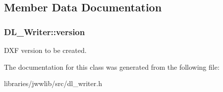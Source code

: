 \subsection{Member Data Documentation}
\hypertarget{classDL__Writer_af82f15c96f8ddaa4ebfffdb5ea41fb8c}{
\subsubsection[{version}]{ D\-L\-\_\-\-Writer\-::version\hspace{0.3cm}{\ttfamily [protected]}}}\label{classDL__Writer_af82f15c96f8ddaa4ebfffdb5ea41fb8c}
D\-X\-F version to be created. 

The documentation for this class was generated from the following file\-:\begin{DoxyCompactItemize}
\item 
libraries/jwwlib/src/dl\-\_\-writer.\-h\end{DoxyCompactItemize}
